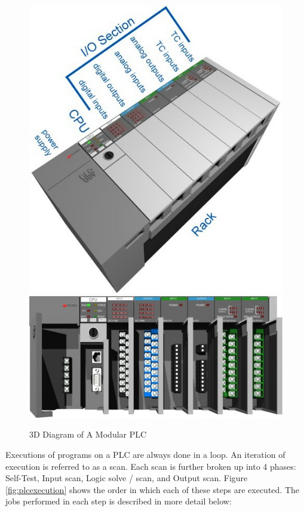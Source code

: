 \begin{figure}[htp]
    \centering
    \includegraphics[width=\imgsmlphoto]{./images/c02_plcdev.jpg}
    \includegraphics[width=\imgsmlphoto]{./images/c04_plcdev.jpg}
    \caption{3D Diagram of A Modular PLC \cite{img_c02_PlcDev,img_c04_PlcDev}}
    \label{img:plcrender_1}
\end{figure}

\pagebreak
Executions of programs on a PLC are always done in a loop. An iteration of execution is referred 
to as a scan. Each scan is further broken up into 4 phases: Self-Test, Input scan, Logic solve / scan, 
and Output scan. Figure \ref{fig:plcexecution} shows the order in which each of these steps 
are executed. The jobs performed in each step is 
described in more detail below:


